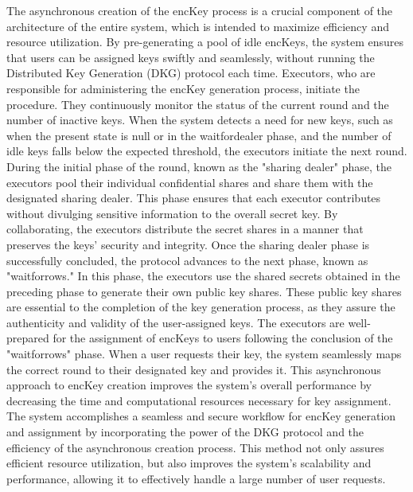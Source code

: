 \documentclass[../Main.tex]{subfiles}
\begin{document}
The asynchronous creation of the encKey process is a crucial component of the architecture of the entire system, which is intended to maximize efficiency and resource utilization. By pre-generating a pool of idle encKeys, the system ensures that users can be assigned keys swiftly and seamlessly, without running the Distributed Key Generation (DKG) protocol each time. Executors, who are responsible for administering the encKey generation process, initiate the procedure. They continuously monitor the status of the current round and the number of inactive keys. When the system detects a need for new keys, such as when the present state is null or in the waitfordealer phase, and the number of idle keys falls below the expected threshold, the executors initiate the next round. During the initial phase of the round, known as the "sharing dealer" phase, the executors pool their individual confidential shares and share them with the designated sharing dealer. This phase ensures that each executor contributes without divulging sensitive information to the overall secret key. By collaborating, the executors distribute the secret shares in a manner that preserves the keys' security and integrity. Once the sharing dealer phase is successfully concluded, the protocol advances to the next phase, known as "waitforrows." In this phase, the executors use the shared secrets obtained in the preceding phase to generate their own public key shares. These public key shares are essential to the completion of the key generation process, as they assure the authenticity and validity of the user-assigned keys. The executors are well-prepared for the assignment of encKeys to users following the conclusion of the "waitforrows" phase. When a user requests their key, the system seamlessly maps the correct round to their designated key and provides it. This asynchronous approach to encKey creation improves the system's overall performance by decreasing the time and computational resources necessary for key assignment. The system accomplishes a seamless and secure workflow for encKey generation and assignment by incorporating the power of the DKG protocol and the efficiency of the asynchronous creation process. This method not only assures efficient resource utilization, but also improves the system's scalability and performance, allowing it to effectively handle a large number of user requests.
\end{document}
